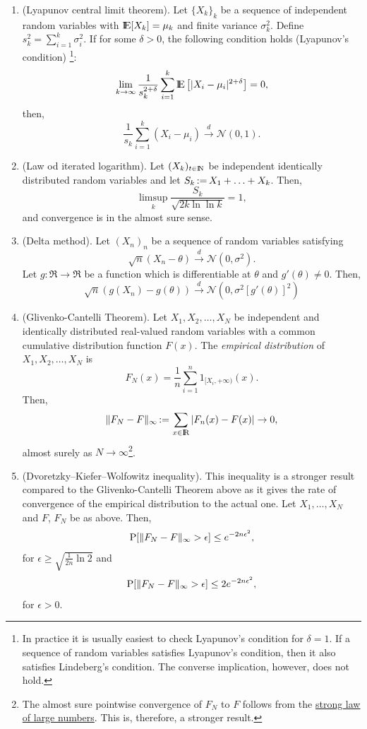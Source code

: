 \documentclass[a4paper,10pt]{scrbook}
\begin{document}
\begin{enumerate}
   \item (Lyapunov central limit theorem). Let $\{X_k\}_k$ be a sequence of independent random variables
         with $\E[X_k]=\mu_k$ and finite variance $\sigma_k^2$. Define $s_k^2 = \sum_{i=1}^{k}\sigma_i^2$.
         If for some $\delta>0$, the following condition holds (Lyapunov's condition)%
         \footnote{In practice it is usually easiest to check Lyapunov's condition for $\delta=1$. 
                   If a sequence of random variables satisfies Lyapunov's condition, then it also 
                   satisfies Lindeberg's condition. The converse implication, however, does not hold.}:
         \[
          \lim_{k\to\infty} \frac{1}{s_k^{2+\delta}}\sum_{i=1}^{k}\E\left[ 
          |X_i - \mu_i|^{2+\delta}
          \right]=0,
         \]
	 then,
	 \[
	  \frac{1}{s_k}\sum_{i=1}^{k}(X_i - \mu_i) \overset{d}{\longrightarrow} \mathcal{N}(0, 1).
	 \]

 \item (Law od iterated logarithm). Let \((X_k)_{t\in\N}\) be independent identically 
       distributed random variables and let \(S_k{}{}\mathop{\mathrel{:}=}{}{} X_1 + \ldots + X_k\). Then,
       \[
        \limsup_{k}\frac{S_k}{\sqrt{2k\ln \ln k}} = 1,
       \]
       and convergence is in the almost sure sense.

 \item (Delta method). Let \((X_n)_n\) be a sequence of random variables satisfying
 \[
  \sqrt{n}(X_n - \theta) \overset{d}{\to} \mathcal{N}(0,\sigma^2).
 \]
 Let \(g:\Re\to\Re\) be a function which is differentiable at \(\theta\) and \(g'(\theta)\neq 0\).
 Then,
 \[
  \sqrt{n} (g(X_n) - g(\theta)) \overset{d}{\to} \mathcal{N}(0, \sigma^2[g'(\theta)]^2)
 \]
 
 \item (Glivenko-Cantelli Theorem). Let $X_1, X_2, \ldots, X_N$ be independent and identically
       distributed real-valued random variables with a common cumulative distribution function 
       $F(x)$. The \textit{empirical distribution} of $X_1, X_2, \ldots, X_N$ is 
       \[
        F_N(x) = \frac{1}{n}\sum_{i=1}^{n}1_{[X_i, +\infty)}(x). 
       \]
       Then, 
       \[
        \|F_N - F\|_\infty {}\dfn{} \sum_{x\in \Re}|F_n(x) - F(x)| \to 0,
       \]
       almost surely as $N\to\infty$\footnote{The almost sure pointwise convergence of $F_N$ to $F$
       follows from the \hyperlink{link:sLLN}{strong law of large numbers}. This is, therefore, a stronger result.}.

 \item (Dvoretzky--Kiefer--Wolfowitz inequality). 
       This inequality is a stronger result compared to the Glivenko-Cantelli Theorem above
       as it gives the rate of convergence of the empirical distribution to the actual one.
       Let $X_1,\ldots, X_N$ and $F$, $F_N$ be as above. Then,
       \[
        \mathrm{P}[\|F_N-F\|_{\infty} > \epsilon] \leq e^{-2n\epsilon^2},
       \]
       for $\epsilon \geq \sqrt{\frac{1}{2n}\ln 2}$ and
       \[
        \mathrm{P}[\|F_N-F\|_{\infty} > \epsilon] \leq 2e^{-2n\epsilon^2},
       \]
       for $\epsilon > 0$.

 

\end{enumerate}
\end{document}

